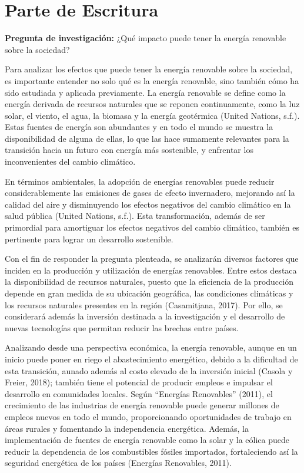 \documentclass[
  letterpaper,
  DIV=11,
  numbers=noendperiod]{scrreprt}
\begin{document}
\section{Parte de Escritura}\label{parte-de-escritura}

\textbf{Pregunta de investigación:} ¿Qué impacto puede tener la energía
renovable sobre la sociedad?

Para analizar los efectos que puede tener la energía renovable sobre la
sociedad, es importante entender no solo qué es la energía renovable,
sino también cómo ha sido estudiada y aplicada previamente. La energía
renovable se define como la energía derivada de recursos naturales que
se reponen continuamente, como la luz solar, el viento, el agua, la
biomasa y la energía geotérmica (United Nations, s.f.). Estas fuentes de
energía son abundantes y en todo el mundo se muestra la disponibilidad
de alguna de ellas, lo que las hace sumamente relevantes para la
transición hacia un futuro con energía más sostenible, y enfrentar los
inconvenientes del cambio climático.

En términos ambientales, la adopción de energías renovables puede
reducir considerablemente las emisiones de gases de efecto invernadero,
mejorando así la calidad del aire y disminuyendo los efectos negativos
del cambio climático en la salud pública (United Nations, s.f.). Esta
transformación, además de ser primordial para amortiguar los efectos
negativos del cambio climático, también es pertinente para lograr un
desarrollo sostenible.

Con el fin de responder la pregunta plenteada, se analizarán diversos
factores que inciden en la producción y utilización de energías
renovables. Entre estos destaca la disponibilidad de recursos naturales,
puesto que la eficiencia de la producción depende en gran medida de su
ubicación geográfica, las condiciones climáticas y los recursos
naturales presentes en la región (Casamitjana, 2017). Por ello, se
considerará además la inversión destinada a la investigación y el
desarrollo de nuevas tecnologías que permitan reducir las brechas entre
países.

Analizando desde una perspectiva económica, la energía renovable, aunque
en un inicio puede poner en riego el abastecimiento energético, debido a
la dificultad de esta transición, aunado además al costo elevado de la
inversión inicial (Casola y Freier, 2018); también tiene el potencial de
producir empleos e impulsar el desarrollo en comunidades locales. Según
``Energías Renovables'' (2011), el crecimiento de las industrias de
energía renovable puede generar millones de empleos nuevos en todo el
mundo, proporcionando oportunidades de trabajo en áreas rurales y
fomentando la independencia energética. Además, la implementación de
fuentes de energía renovable como la solar y la eólica puede reducir la
dependencia de los combustibles fósiles importados, fortaleciendo así la
seguridad energética de los países (Energías Renovables, 2011).
\end{document}
